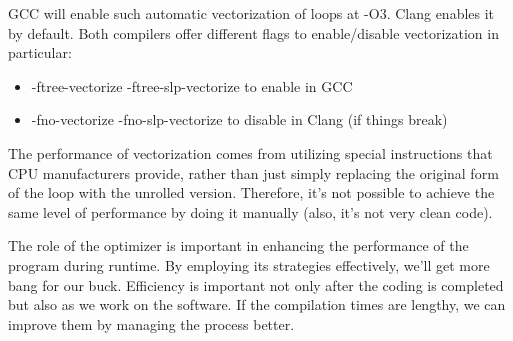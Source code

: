 GCC will enable such automatic vectorization of loops at -O3. Clang enables it by default. Both compilers offer different flags to enable/disable vectorization in particular:

\begin{itemize}
\item 
-ftree-vectorize -ftree-slp-vectorize to enable in GCC

\item 
-fno-vectorize -fno-slp-vectorize to disable in Clang (if things break)
\end{itemize}

The performance of vectorization comes from utilizing special instructions that CPU manufacturers provide, rather than just simply replacing the original form of the loop with the unrolled version. Therefore, it's not possible to achieve the same level of performance by doing it manually (also, it's not very clean code).

The role of the optimizer is important in enhancing the performance of the program during runtime. By employing its strategies effectively, we'll get more bang for our buck. Efficiency is important not only after the coding is completed but also as we work on the software. If the compilation times are lengthy, we can improve them by managing the process better.





